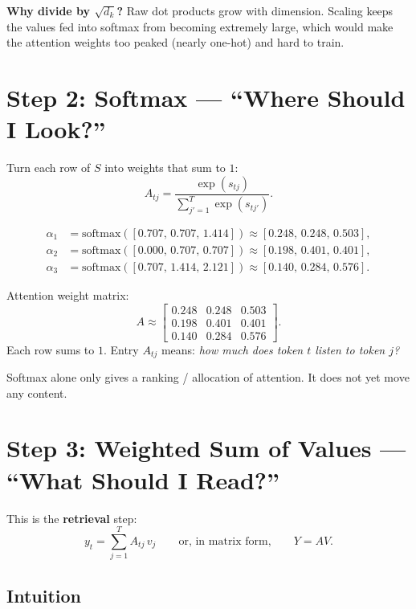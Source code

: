 \documentclass[11pt]{article}
\begin{document}
\noindent\textbf{Why divide by \(\sqrt{d_k}\)?}
Raw dot products grow with dimension. Scaling keeps the values fed into
softmax from becoming extremely large, which would make the attention
weights too peaked (nearly one-hot) and hard to train.

\section{Step 2: Softmax --- ``Where Should I Look?''}

Turn each row of \(S\) into weights that sum to \(1\):
\[
  A_{tj}
  =
  \frac{\exp(s_{tj})}{\sum_{j'=1}^{T}\exp(s_{tj'})}.
\]

\begin{align*}
  \alpha_1 &= \mathrm{softmax}([0.707,\,0.707,\,1.414])
           \approx [0.248,\,0.248,\,0.503], \\
  \alpha_2 &= \mathrm{softmax}([0.000,\,0.707,\,0.707])
           \approx [0.198,\,0.401,\,0.401], \\
  \alpha_3 &= \mathrm{softmax}([0.707,\,1.414,\,2.121])
           \approx [0.140,\,0.284,\,0.576].
\end{align*}

Attention weight matrix:
\[
  A \approx
  \begin{bmatrix}
    0.248 & 0.248 & 0.503 \\
    0.198 & 0.401 & 0.401 \\
    0.140 & 0.284 & 0.576
  \end{bmatrix}.
\]
Each row sums to \(1\). Entry \(A_{tj}\) means:
\emph{how much does token \(t\) listen to token \(j\)?}

Softmax alone only gives a ranking / allocation of attention.
It does not yet move any content.

\section{Step 3: Weighted Sum of Values --- ``What Should I Read?''}

This is the \textbf{retrieval} step:
\[
  y_t = \sum_{j=1}^{T} A_{tj}\, v_j
  \qquad\text{or, in matrix form,}\qquad
  Y = AV.
\]

\subsection{Intuition}
\end{document}
